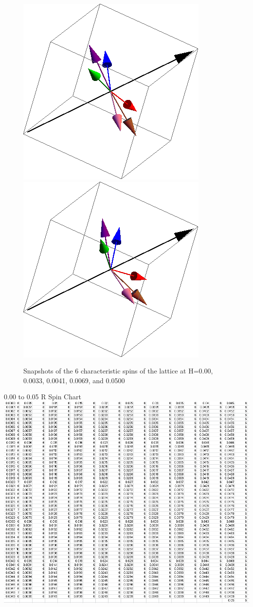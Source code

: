 \documentclass{article}
\begin{document}
\begin{figure}[ht]
\includegraphics[scale=0.27]{111_3000/069S000to005R.png}
\includegraphics[scale=0.27]{111_3000/501S000to005R.png}
\caption{Snapshots of the 6 characteristic spins of the lattice at H=0.00, 0.0033, 0.0041, 0.0069, and 0.0500}
\end{figure}

\pagebreak
\begin{center}
\LARGE 0.00 to 0.05 R Spin Chart
 \includegraphics[keepaspectratio,scale=0.7]{111_3000/000to005RSpinChart.png}
\end{center}
\pagebreak
\end{document}

